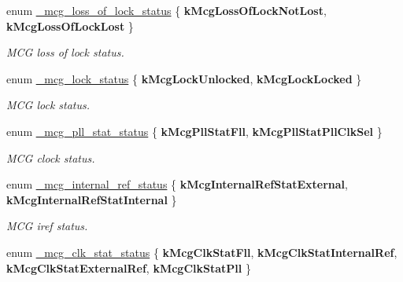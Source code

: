 \begin{DoxyCompactItemize}
enum \hyperlink{group__mcg__hal_ga0cadce5128e76d90b1f950b0e4af96b4}{\+\_\+mcg\+\_\+loss\+\_\+of\+\_\+lock\+\_\+status} \{ {\bfseries k\+Mcg\+Loss\+Of\+Lock\+Not\+Lost}, 
{\bfseries k\+Mcg\+Loss\+Of\+Lock\+Lost}
 \}\hypertarget{group__mcg__hal_ga0cadce5128e76d90b1f950b0e4af96b4}{}\label{group__mcg__hal_ga0cadce5128e76d90b1f950b0e4af96b4}
\begin{DoxyCompactList}\small\item\em M\+CG loss of lock status. \end{DoxyCompactList}
\item 
enum \hyperlink{group__mcg__hal_gaf76ca47748ece2d5f60d46a75ff67a7c}{\+\_\+mcg\+\_\+lock\+\_\+status} \{ {\bfseries k\+Mcg\+Lock\+Unlocked}, 
{\bfseries k\+Mcg\+Lock\+Locked}
 \}\hypertarget{group__mcg__hal_gaf76ca47748ece2d5f60d46a75ff67a7c}{}\label{group__mcg__hal_gaf76ca47748ece2d5f60d46a75ff67a7c}
\begin{DoxyCompactList}\small\item\em M\+CG lock status. \end{DoxyCompactList}
\item 
enum \hyperlink{group__mcg__hal_gafaa982941f2a56f98ea43547b43a88ad}{\+\_\+mcg\+\_\+pll\+\_\+stat\+\_\+status} \{ {\bfseries k\+Mcg\+Pll\+Stat\+Fll}, 
{\bfseries k\+Mcg\+Pll\+Stat\+Pll\+Clk\+Sel}
 \}\hypertarget{group__mcg__hal_gafaa982941f2a56f98ea43547b43a88ad}{}\label{group__mcg__hal_gafaa982941f2a56f98ea43547b43a88ad}
\begin{DoxyCompactList}\small\item\em M\+CG clock status. \end{DoxyCompactList}
\item 
enum \hyperlink{group__mcg__hal_ga95436f592752a9f4f61d83d656d9719c}{\+\_\+mcg\+\_\+internal\+\_\+ref\+\_\+status} \{ {\bfseries k\+Mcg\+Internal\+Ref\+Stat\+External}, 
{\bfseries k\+Mcg\+Internal\+Ref\+Stat\+Internal}
 \}\hypertarget{group__mcg__hal_ga95436f592752a9f4f61d83d656d9719c}{}\label{group__mcg__hal_ga95436f592752a9f4f61d83d656d9719c}
\begin{DoxyCompactList}\small\item\em M\+CG iref status. \end{DoxyCompactList}
\item 
enum \hyperlink{group__mcg__hal_gaddcbf0f48f40da43344b0954c39a98a7}{\+\_\+mcg\+\_\+clk\+\_\+stat\+\_\+status} \{ {\bfseries k\+Mcg\+Clk\+Stat\+Fll}, 
{\bfseries k\+Mcg\+Clk\+Stat\+Internal\+Ref}, 
{\bfseries k\+Mcg\+Clk\+Stat\+External\+Ref}, 
{\bfseries k\+Mcg\+Clk\+Stat\+Pll}
 \}\hypertarget{group__mcg__hal_gaddcbf0f48f40da43344b0954c39a98a7}{}\label{group__mcg__hal_gaddcbf0f48f40da43344b0954c39a98a7}

\end{DoxyCompactItemize}

